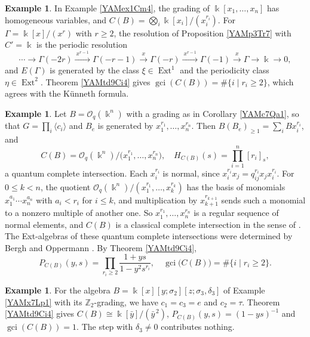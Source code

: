 \documentclass[reqno]{amsart}
\numberwithin{equation}{section}
\theoremstyle{definition}
\newtheorem{example}[equation]{Example}
\theoremstyle{remark}
\theoremstyle{plain}
\newcommand{\kk}{\Bbbk}
\DeclareMathOperator{\Ext}{Ext}
\DeclareMathOperator{\gci}{gci}
\begin{document}
\begin{example}\label{YAMsh5Ge1}
In Example \ref{YAMex1Cm4}, the grading of $\kk[x_1,\dots,x_n]$ has homogeneous variables, and $C(B)=\bigotimes_i\kk[x_i]/(x_i^{r_i})$. For $\Gamma=\kk[x]/(x^r)$ with $r\ge2$, the resolution of Proposition \ref{YAMp3Tr7} with $C'=\kk$ is the periodic resolution
\[
\cdots\to\Gamma(-2r)\xrightarrow{\ x^{r-1}\ }\Gamma(-r-1)\xrightarrow{\ x\ }\Gamma(-r)\xrightarrow{\ x^{r-1}\ }\Gamma(-1)\xrightarrow{\ x\ }\Gamma\to\kk\to0,
\]
and $E(\Gamma)$ is generated by the class $\xi\in\Ext^1$ and the periodicity class $\eta\in\Ext^2$. Theorem \ref{YAMtd9Ci4} gives $\gci(C(B))=\#\{i\mid r_i\ge2\}$, which agrees with the K\"unneth formula.
\end{example}

\begin{example}\label{YAMex16Qc9}
Let $B=\mathcal O_q(\kk^n)$ with a grading as in Corollary \ref{YAMc7Qa1}, so that $G=\prod_i\langle c_i\rangle$ and $B_e$ is generated by $x_1^{r_1},\dots,x_n^{r_n}$. Then $B(B_e)_{\ge1}=\sum_iBx_i^{r_i}$, and
\[
C(B)=\mathcal O_q(\kk^n)/\big(x_1^{r_1},\dots,x_n^{r_n}\big),\quad H_{C(B)}(s)=\prod_{i=1}^n[r_i]_s,
\]
a quantum complete intersection. Each $x_i^{r_i}$ is normal, since $x_i^{r_i}x_j=q_{ij}^{r_i}x_jx_i^{r_i}$. For $0\le k<n$, the quotient $\mathcal O_q(\kk^n)/(x_1^{r_1},\dots,x_k^{r_k})$ has the basis of monomials $x_1^{a_1}\cdots x_n^{a_n}$ with $a_i<r_i$ for $i\le k$, and multiplication by $x_{k+1}^{r_{k+1}}$ sends such a monomial to a nonzero multiple of another one. So $x_1^{r_1},\dots,x_n^{r_n}$ is a regular sequence of normal elements, and $C(B)$ is a classical complete intersection in the sense of \cite[Definition 1.3]{KKZ2}. The Ext-algebras of these quantum complete intersections were determined by Bergh and Oppermann \cite[Theorem 5.3]{BO}. By Theorem \ref{YAMtd9Ci4},
\[
P_{C(B)}(y,s)=\prod_{r_i\ge2}\frac{1+ys}{1-y^2s^{r_i}},\quad\gci\big(C(B)\big)=\#\{i\mid r_i\ge2\}.
\]
\end{example}

\begin{example}\label{YAMex5Cb3}
For the algebra $B=\kk[x][y;\sigma_2][z;\sigma_3,\delta_3]$ of Example \ref{YAMx7Lp1} with its $\mathbb Z_2$-grading, we have $c_1=c_3=e$ and $c_2=\tau$. Theorem \ref{YAMtd9Ci4} gives $C(B)\cong\kk[\bar y]/(\bar y^{\,2})$, $P_{C(B)}(y,s)=(1-ys)^{-1}$ and $\gci(C(B))=1$. The step with $\delta_3\neq0$ contributes nothing.
\end{example}
\end{document}
